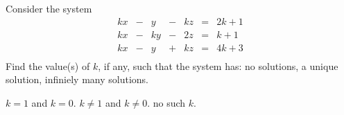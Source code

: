 
\begin{Exercise}[name={},
title={}, 
origin={\cite{BS}},
counter=Exercise]
Consider the system
\[
\begin{array}{rrrrrrrr}
kx & - & y  & - & kz & =& 2k+1\\
kx & - & ky & - & 2z & =&  k+1\\
kx & - & y  & + & kz & =&  4k+3\\
\end{array}
\]
Find the value(s) of $k$, if any, such that the system has:
\Question no solutions,
\Question a unique solution, 
\Question infiniely many solutions.
\end{Exercise}

\begin{Answer}
\begin{multicols}{2}
\Question $k= 1$ and $k= 0$.
\Question $k\neq 1$ and $k\neq 0$.
\Question no such $k$.
\EndCurrentQuestion
\end{multicols}
\end{Answer}

